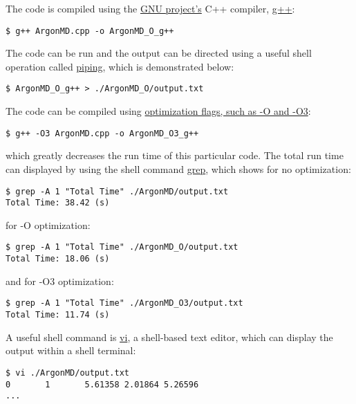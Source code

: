 The code is compiled using the 
\href{http://www.gnu.org/}{GNU project's} 
C++ compiler, \href{http://www.cprogramming.com/g++.html}{g++}:
\begin{lstlisting}
$ g++ ArgonMD.cpp -o ArgonMD_O_g++
\end{lstlisting}
The code can be run and the output can be directed using a useful 
shell operation called 
\href{http://www.linfo.org/pipes.html}{piping}, 
which is demonstrated below:
\begin{lstlisting}
$ ArgonMD_O_g++ > ./ArgonMD_O/output.txt
\end{lstlisting}
The code can be compiled using 
\href{http://gcc.gnu.org/onlinedocs/gcc/Optimize-Options.html#Optimize-Options}
{optimization flags, such as -O and -O3}:
\begin{lstlisting}
$ g++ -O3 ArgonMD.cpp -o ArgonMD_O3_g++
\end{lstlisting}
which greatly decreases the run time of this particular code. 
The total run time 
can displayed by using the shell command 
\href{http://linux.about.com/od/commands/l/blcmdl1_grep.htm}{grep},  
which shows for no optimization:
\begin{lstlisting}
$ grep -A 1 "Total Time" ./ArgonMD/output.txt
Total Time: 38.42 (s)
\end{lstlisting}
for -O optimization:
\begin{lstlisting}
$ grep -A 1 "Total Time" ./ArgonMD_O/output.txt
Total Time: 18.06 (s)
\end{lstlisting}
and for -O3 optimization:
\begin{lstlisting}
$ grep -A 1 "Total Time" ./ArgonMD_O3/output.txt
Total Time: 11.74 (s)
\end{lstlisting}
A useful shell command is 
\href{http://www.tuxfiles.org/linuxhelp/vimcheat.html}{vi}, a 
shell-based text editor, which can display the output within 
a shell terminal:
\begin{lstlisting}
$ vi ./ArgonMD/output.txt
0       1       5.61358 2.01864 5.26596
...
\end{lstlisting}

